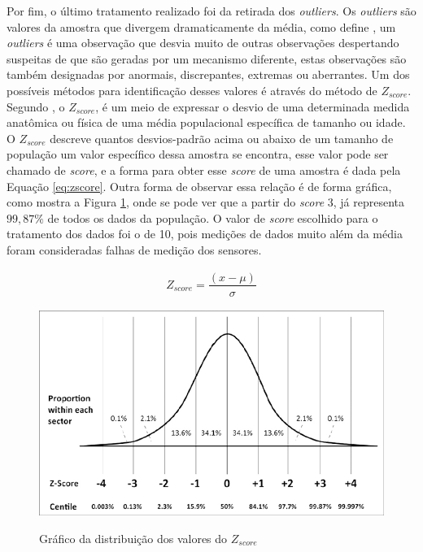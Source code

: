 \documentclass[acronym,symbols,table]{fei}
\begin{document}
Por fim, o último tratamento realizado foi da retirada dos \textit{outliers}. Os \textit{outliers} são valores da amostra que divergem dramaticamente da média, como define \textcite{barnett1994outliers}, um \textit{outliers} é uma observação que desvia muito de outras observações despertando suspeitas de que são geradas por um mecanismo diferente, estas observações são também designadas por anormais, discrepantes, extremas ou aberrantes. Um dos possíveis métodos para identificação desses valores é através do método de \textit{${Z}_{score}$}. Segundo \textcite{curtis2016mystery}, o \textit{${Z}_{score}$}, é um meio de expressar o desvio de uma determinada medida anatômica ou física de uma média populacional específica de tamanho ou idade. O \textit{${Z}_{score}$} descreve quantos desvios-padrão acima ou abaixo de um tamanho de população um valor específico dessa amostra se encontra, esse valor pode ser chamado de \textit{score}, e a forma para obter esse \textit{score} de uma amostra é dada pela Equação \ref{eq:zscore}. Outra forma de observar essa relação é de forma gráfica, como mostra a Figura \ref{fig:zscore}, onde se pode ver que a partir do \textit{score} 3, já representa $99,87\%$ de todos os dados da população. O valor de \textit{score} escolhido para o tratamento dos dados foi o de 10, pois medições de dados muito além da média foram consideradas falhas de medição dos sensores.   

\begin{equation} \label{eq:zscore}
    \begin{aligned}
    {Z}_{score}= \dfrac{({x} -{\mu})}{\sigma}
    \end{aligned}
\end{equation}

\begin{figure}[!htb]
    \centering
    \caption{Gráfico da distribuição dos valores do \textit{${Z}_{score}$}}
    \includegraphics[width=0.7\linewidth]{Imagens/Z_score.jpg}
    \label{fig:zscore}
\end{figure}
\end{document}
